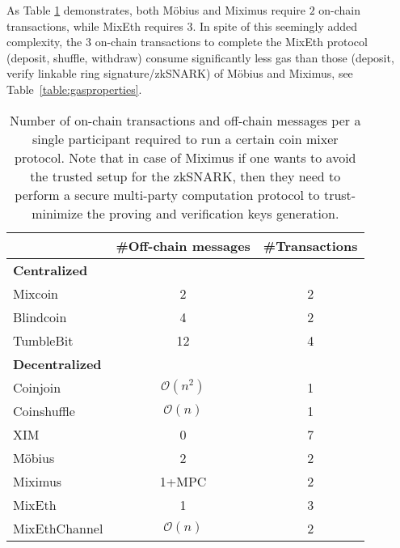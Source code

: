 \documentclass[conference, compsoc]{IEEEtran}
\theoremstyle{definition}
\begin{document}
As Table \ref{table:communicationcomplexity} demonstrates, both Möbius and Miximus require $2$ on-chain transactions, while MixEth requires $3$. In spite of this seemingly added complexity, the 3 on-chain transactions to complete the MixEth protocol (deposit, shuffle, withdraw) consume significantly less gas than those (deposit, verify linkable ring signature/zkSNARK) of Möbius and Miximus, see Table~\ref{table:gasproperties}. 
\begin{table}[H] 
	\caption{Number of on-chain transactions and off-chain messages per a single participant required to run a certain coin mixer protocol. Note that in case of Miximus if one wants to avoid the trusted setup for the zkSNARK, then they need to perform a secure multi-party computation protocol to trust-minimize the proving and verification keys generation.}
	\centering 
	\begin{tabular}{lcc} 
		
		\toprule
		&\#Off-chain messages& \#Transactions \\
		\midrule
		\textbf{Centralized} & & \\
		\midrule
		Mixcoin \cite{bonneau2014mixcoin} & 2      & 2       \\
		Blindcoin \cite{valenta2015blindcoin} & 4      & 2       \\
		TumbleBit \cite{heilman2017tumblebit} & 12      & 4      \\
		\midrule
		\textbf{Decentralized}      &    &      \\
		\midrule
		Coinjoin \cite{maxwell2013coinjoin} &  $\mathcal{O}(n^2)$     & 1       \\
		Coinshuffle \cite{ruffing2014coinshuffle} &$\mathcal{O}(n)$       & 1       \\
		XIM \cite{bissias2014sybil} & 0      & 7       \\
		Möbius \cite{meiklejohn2018mobius} & 2    & 2       \\
		Miximus \cite{miximus2018} & 1+MPC & 2 \\
		MixEth & 1 & 3 \\
		MixEthChannel  & $\mathcal{O}(n)$ &2 \\
		\bottomrule
	\end{tabular}
	\label{table:communicationcomplexity}
\end{table}
\end{document}
